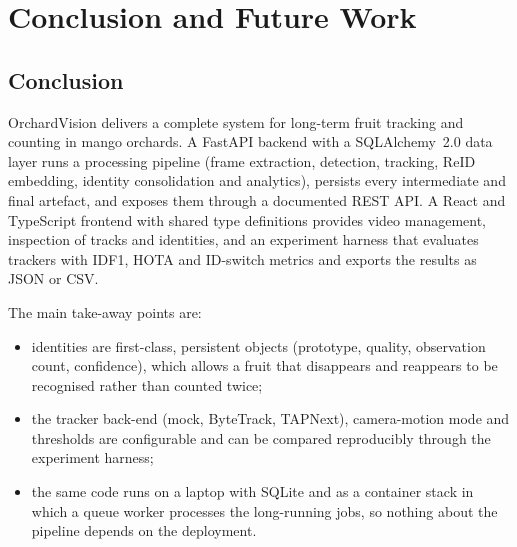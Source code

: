 \chapter{Conclusion and Future Work}

\section{Conclusion}

OrchardVision delivers a complete system for long-term fruit tracking and counting in mango orchards. A FastAPI backend with a SQLAlchemy~2.0 data layer runs a processing pipeline (frame extraction, detection, tracking, ReID embedding, identity consolidation and analytics), persists every intermediate and final artefact, and exposes them through a documented REST API. A React and TypeScript frontend with shared type definitions provides video management, inspection of tracks and identities, and an experiment harness that evaluates trackers with IDF1, HOTA and ID-switch metrics and exports the results as JSON or CSV.

The main take-away points are:

\begin{itemize}
  \item identities are first-class, persistent objects (prototype, quality, observation count, confidence), which allows a fruit that disappears and reappears to be recognised rather than counted twice;
  \item the tracker back-end (mock, ByteTrack, TAPNext), camera-motion mode and thresholds are configurable and can be compared reproducibly through the experiment harness;
  \item the same code runs on a laptop with SQLite and as a container stack in which a queue worker processes the long-running jobs, so nothing about the pipeline depends on the deployment.
\end{itemize}


